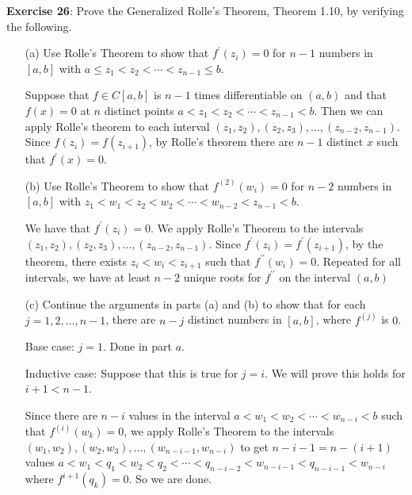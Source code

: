 \documentclass{article}
\begin{document}
\textbf{Exercise 26}:
    Prove the Generalized Rolle's Theorem, Theorem 1.10, by verifying the following.
    \begin{itemize}
        \item [(a)] Use Rolle's Theorem to show that $f^{\prime}(z_{i}) = 0$ for $n - 1$ numbers in $[a, b]$ with $a \leq z_{1} < z_{2} < \cdots < z_{n - 1} \leq b$.
            \begin{answer}
                Suppose that $f \in C[a, b]$ is $n - 1$ times differentiable on $(a, b)$ and that $f(x) = 0$ at $n$ distinct points $a < z_{1} < z_{2} < \cdots < z_{n - 1} < b$. Then we can apply Rolle's theorem to each interval $(z_{1}, z_{2}), (z_{2}, z_{3}), \ldots, (z_{n - 2}, z_{n - 1})$. Since $f(z_{i}) = f(z_{i + 1})$, by Rolle's theorem there are $n - 1$ distinct $x$ such that $f^{\prime}(x) = 0$.
            \end{answer}

        \item [(b)] Use Rolle's Theorem to show that $f^{(2)}(w_{i}) = 0$ for $n - 2$ numbers in $[a, b]$ with $z_{1} < w_{1} < z_{2} < w_{2} < \cdots < w_{n - 2} < z_{n - 1} < b$.
            \begin{answer}
                We have that $f^{\prime}(z_{i}) = 0$. We apply Rolle's Theorem to the intervals $(z_{1}, z_{2}), (z_{2}, z_{3}), \ldots, (z_{n - 2}, z_{n - 1})$. Since $f^{\prime}(z_{i}) = f^{\prime}(z_{i + 1})$, by the theorem, there exists $z_{i} < w_{i} < z_{i + 1}$ such that $f^{\prime\prime}(w_{i}) = 0$. Repeated for all intervals, we have at least $n - 2$ unique roots for $f^{\prime\prime}$ on the interval $(a, b)$
            \end{answer}

        \item [(c)] Continue the arguments in parts (a) and (b) to show that for each $j = 1, 2, \ldots, n - 1$, there are $n - j$ distinct numbers in $[a, b]$, where $f^{(j)}$ is $0$.
            \begin{answer}
                Base case: $j = 1$. Done in part $a$.

                Inductive case: Suppose that this is true for $j = i$. We will prove this holds for $i + 1 < n - 1$.

                Since there are $n - i$ values in the interval $a < w_{1} < w_{2} < \cdots < w_{n - i} < b$ such that $f^{(i)}(w_{k}) = 0$, we apply Rolle's Theorem to the intervals $(w_{1}, w_{2}), (w_{2}, w_{3}), \ldots, (w_{n - i - 1}, w_{n - i})$ to get $n - i - 1 = n - (i + 1)$ values $a < w_{1} < q_{1} < w_{2} < q_{2} < \cdots < q_{n - i - 2} < w_{n - i - 1} < q_{n - i - 1} < w_{n - i}$ where $f^{i + 1}(q_{k}) = 0$. So we are done.
            \end{answer}


\end{itemize}
\end{document}
